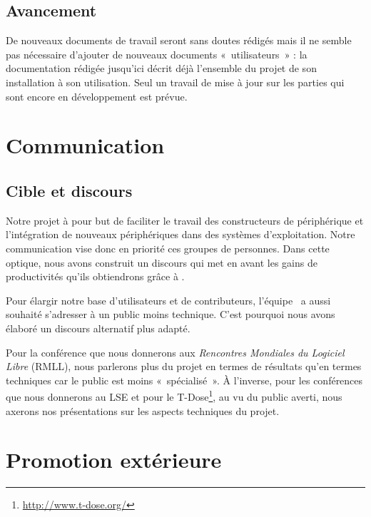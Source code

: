 \documentclass[francais]{rtxreport}
\begin{document}
\section{Avancement}

De nouveaux documents de travail seront sans doutes rédigés mais il ne semble
pas nécessaire d'ajouter de nouveaux documents «~utilisateurs~» : la
documentation rédigée jusqu'ici décrit déjà l'ensemble du projet de son
installation à son utilisation. Seul un travail de mise à jour sur les parties
qui sont encore en développement est prévue.

\chapter{Communication}



\section{Cible et discours}


Notre projet à pour but de faciliter le travail des constructeurs de
périphérique et l'intégration de nouveaux périphériques dans des systèmes
d'exploitation. Notre communication vise donc en priorité ces groupes de
personnes. Dans cette optique, nous avons construit un discours qui met en avant
les gains de productivités qu'ils obtiendrons grâce à \rtx.

Pour élargir notre base d'utilisateurs et de contributeurs, l'équipe \rtx\ a
aussi souhaité s'adresser à un public moins technique. C'est pourquoi nous
avons élaboré un discours alternatif plus adapté.

Pour la conférence que nous donnerons aux \emph{Rencontres Mondiales du Logiciel
 Libre} (RMLL), nous parlerons plus du projet en termes de résultats qu'en
termes techniques car le public est moins «~spécialisé~». À l'inverse, pour les
conférences que nous donnerons au LSE et pour le
T-Dose\footnote{\url{http://www.t-dose.org/}}, au vu du public averti, nous
axerons nos présentations sur les aspects techniques du projet.

\chapter{Promotion extérieure}
\end{document}
